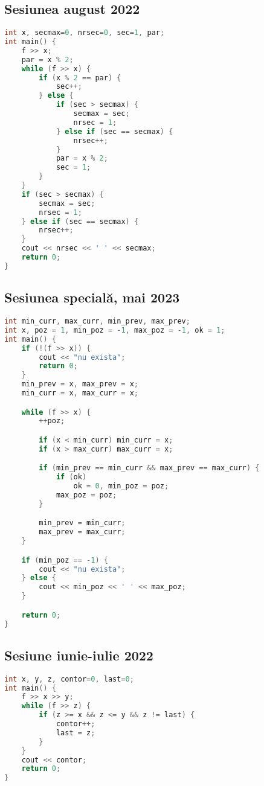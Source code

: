 \documentclass[10pt, a4paper, twocolumn]{article}
\begin{document}
\subsection*{Sesiunea august 2022}
\begin{lstlisting}[language=C++]
int x, secmax=0, nrsec=0, sec=1, par;
int main() {
    f >> x;
    par = x % 2;
    while (f >> x) {
        if (x % 2 == par) {
            sec++;
        } else {
            if (sec > secmax) {
                secmax = sec;
                nrsec = 1;
            } else if (sec == secmax) {
                nrsec++;
            }
            par = x % 2;
            sec = 1;
        }
    }
    if (sec > secmax) {
        secmax = sec;
        nrsec = 1;
    } else if (sec == secmax) {
        nrsec++;
    }
    cout << nrsec << ' ' << secmax;
    return 0;
}
\end{lstlisting}


\subsection*{Sesiunea specială, mai 2023}
\begin{lstlisting}[language=C++]
int min_curr, max_curr, min_prev, max_prev;
int x, poz = 1, min_poz = -1, max_poz = -1, ok = 1;
int main() {
    if (!(f >> x)) {
        cout << "nu exista";
        return 0;
    }
    min_prev = x, max_prev = x;
    min_curr = x, max_curr = x;

    while (f >> x) {
        ++poz;

        if (x < min_curr) min_curr = x;
        if (x > max_curr) max_curr = x;

        if (min_prev == min_curr && max_prev == max_curr) {
            if (ok)
                ok = 0, min_poz = poz;
            max_poz = poz;
        }

        min_prev = min_curr;
        max_prev = max_curr;
    }

    if (min_poz == -1) {
        cout << "nu exista";
    } else {
        cout << min_poz << ' ' << max_poz;
    }

    return 0;
}
\end{lstlisting}


\newpage
\subsection*{Sesiune iunie-iulie 2022}
\begin{lstlisting}[language=C++]
int x, y, z, contor=0, last=0;
int main() {
    f >> x >> y;
    while (f >> z) {
        if (z >= x && z <= y && z != last) {
            contor++;
            last = z;
        }
    }
    cout << contor;
    return 0;
}
\end{lstlisting}
\end{document}
